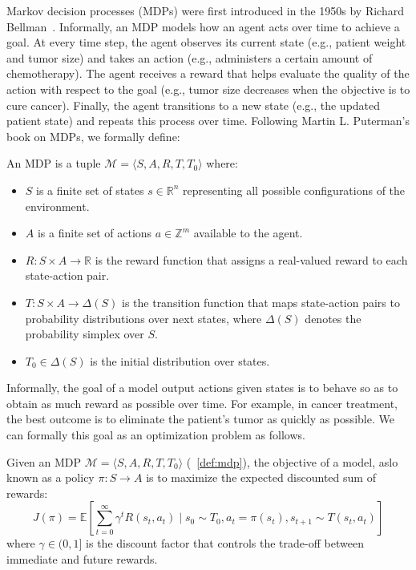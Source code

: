 Markov decision processes (MDPs) were first introduced in the 1950s by Richard Bellman~\cite{Bellman}.
Informally, an MDP models how an agent acts over time to achieve a goal. 
At every time step, the agent observes its current state (e.g., patient weight and tumor size) and takes an action (e.g., administers a certain amount of chemotherapy).
The agent receives a reward that helps evaluate the quality of the action with respect to the goal (e.g., tumor size decreases when the objective is to cure cancer).
Finally, the agent transitions to a new state (e.g., the updated patient state) and repeats this process over time. 
Following Martin L. Puterman's book on MDPs\cite{puterman}, we formally define:
\begin{definition}\label{def:mdp} An MDP is a tuple $\mathcal{M} = \langle S, A, R, T, T_0 \rangle$ where:
\begin{itemize}
\item $S$ is a finite set of states $s \in \mathbb{R}^n$ representing all possible configurations of the environment.
\item $A$ is a finite set of actions $a \in \mathbb{Z}^m$ available to the agent.
\item $R: S \times A \rightarrow \mathbb{R}$ is the reward function that assigns a real-valued reward to each state-action pair.
\item $T: S \times A \rightarrow \Delta(S)$ is the transition function that maps state-action pairs to probability distributions over next states, where $\Delta(S)$ denotes the probability simplex over $S$.
\item $T_0 \in \Delta(S)$ is the initial distribution over states.
\end{itemize}
\end{definition}

Informally, the goal of a model output actions given states is to behave so as to obtain as much reward as possible over time.
For example, in cancer treatment, the best outcome is to eliminate the patient's tumor as quickly as possible.
We can formally this goal as an optimization problem as follows.

\begin{definition}\label{def:mdp-obj} Given an MDP $\mathcal{M}=\langle S, A, R, T, T_0 \rangle$ (~\ref{def:mdp}), the objective of a model, aslo known as a policy $\pi: S \rightarrow A$ is to maximize the expected discounted sum of rewards:
$$J(\pi) = \mathbb{E}\left[\sum_{t=0}^{\infty} \gamma^t R(s_t, a_t) \mid s_0 \sim T_0, a_t = \pi(s_t), s_{t+1} \sim T(s_t, a_t)\right]$$
where $\gamma \in (0,1]$ is the discount factor that controls the trade-off between immediate and future rewards.
\end{definition}

